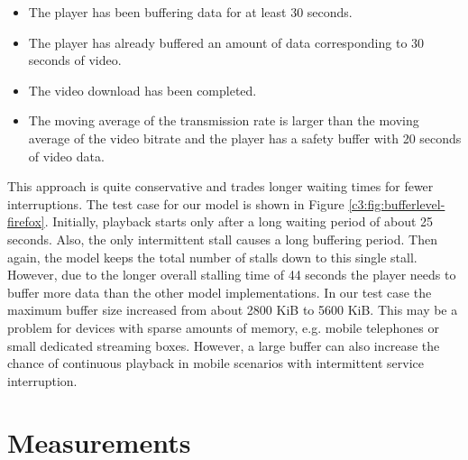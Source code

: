 \begin{itemize}
\item The player has been buffering data for at least 30 seconds.
\item The player has already buffered an amount of data corresponding to 30 seconds of video.
\item The video download has been completed.
\item The moving average of the transmission rate is larger than the moving average of the video bitrate and the player has a safety buffer with 20 seconds of video data.
\end{itemize}

This approach is quite conservative and trades longer waiting times for fewer interruptions. The test case for our model is shown in Figure \ref{c3:fig:bufferlevel-firefox}. Initially, playback starts only after a long waiting period of about 25 seconds. Also, the only intermittent stall causes a long buffering period. Then again, the model keeps the total number of stalls down to this single stall. However, due to the longer overall stalling time of 44 seconds the player needs to buffer more data than the other model implementations. In our test case the maximum buffer size increased from about 2800 KiB to 5600 KiB. This may be a problem for devices with sparse amounts of memory, e.g. mobile telephones or small dedicated streaming boxes. However, a large buffer can also increase the chance of continuous playback in mobile scenarios with intermittent service interruption.







\section{Measurements}
\label{sec:measurements}


